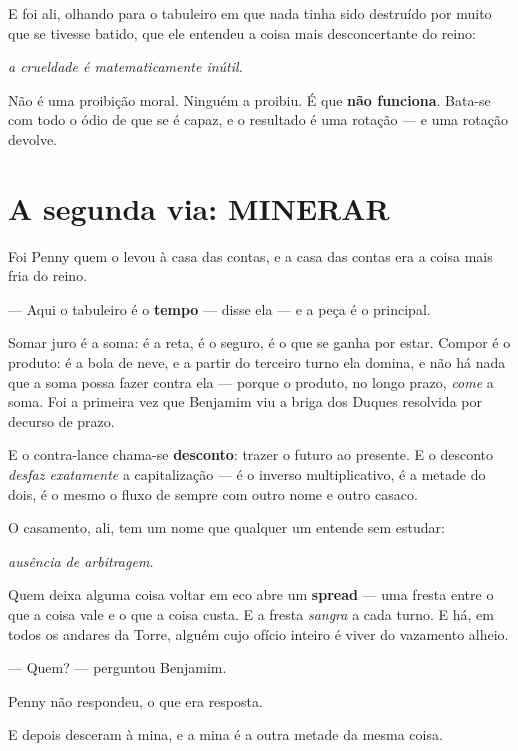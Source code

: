 \documentclass[livro.tex]{subfiles}
\begin{document}
E foi ali, olhando para o tabuleiro em que nada tinha sido destruído por muito que se tivesse batido, que ele
entendeu a coisa mais desconcertante do reino:

\begin{center}\itshape
a crueldade é matematicamente inútil.
\end{center}

Não é uma proibição moral. Ninguém a proibiu. É que \textbf{não funciona}. Bata-se com todo o ódio de que se é
capaz, e o resultado é uma rotação --- e uma rotação devolve.

\section*{A segunda via: MINERAR}

Foi Penny quem o levou à casa das contas, e a casa das contas era a coisa mais fria do reino.

--- Aqui o tabuleiro é o \textbf{tempo} --- disse ela --- e a peça é o principal.

Somar juro é a soma: é a reta, é o seguro, é o que se ganha por estar. Compor é o produto: é a bola de neve, e a
partir do terceiro turno ela domina, e não há nada que a soma possa fazer contra ela --- porque o produto, no longo
prazo, \emph{come} a soma. Foi a primeira vez que Benjamim viu a briga dos Duques resolvida por decurso de prazo.

E o contra-lance chama-se \textbf{desconto}: trazer o futuro ao presente. E o desconto \emph{desfaz exatamente} a
capitalização --- é o inverso multiplicativo, é a metade do dois, é o mesmo o fluxo de sempre com outro nome e outro
casaco.

O casamento, ali, tem um nome que qualquer um entende sem estudar:

\begin{center}\itshape
ausência de arbitragem.
\end{center}

Quem deixa alguma coisa voltar em eco abre um \textbf{spread} --- uma fresta entre o que a coisa vale e o que a coisa custa.
E a fresta \emph{sangra} a cada turno. E há, em todos os andares da Torre, alguém cujo ofício inteiro é viver do
vazamento alheio.

--- Quem? --- perguntou Benjamim.

Penny não respondeu, o que era resposta.

\medskip

E depois desceram à mina, e a mina é a outra metade da mesma coisa.
\end{document}
